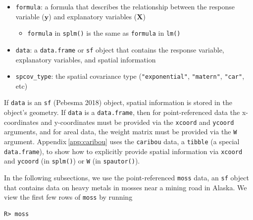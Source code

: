 \documentclass{article}
\providecommand{\tightlist}{%
  \setlength{\itemsep}{0pt}\setlength{\parskip}{0pt}}
\begin{document}
\begin{itemize}
\tightlist
\item
  \texttt{formula}: a formula that describes the relationship between
  the response variable (\(\mathbf{y}\)) and explanatory variables
  (\(\mathbf{X}\))

  \begin{itemize}
  \tightlist
  \item
    \texttt{formula} in \texttt{splm()} is the same as \texttt{formula}
    in \texttt{lm()}
  \end{itemize}
\item
  \texttt{data}: a \texttt{data.frame} or \texttt{sf} object that
  contains the response variable, explanatory variables, and spatial
  information
\item
  \texttt{spcov\_type}: the spatial covariance type
  (\texttt{"exponential"}, \texttt{"matern"}, \texttt{"car"}, etc)
\end{itemize}

If \texttt{data} is an \texttt{sf} (Pebesma 2018) object, spatial
information is stored in the object's geometry. If \texttt{data} is a
\texttt{data.frame}, then for point-referenced data the x-coordinates
and y-coordinates must be provided via the \texttt{xcoord} and
\texttt{ycoord} arguments, and for areal data, the weight matrix must be
provided via the \texttt{W} argument. Appendix\(~\)\ref{app:caribou}
uses the \texttt{caribou} data, a \texttt{tibble} (a special
\texttt{data.frame}), to show how to explicitly provide spatial
information via \texttt{xcoord} and \texttt{ycoord} (in \texttt{splm()})
or \texttt{W} (in \texttt{spautor()}).

In the following subsections, we use the point-referenced \texttt{moss}
data, an \texttt{sf} object that contains data on heavy metals in mosses
near a mining road in Alaska. We view the first few rows of
\texttt{moss} by running

\begin{verbatim}
R> moss
\end{verbatim}
\end{document}
